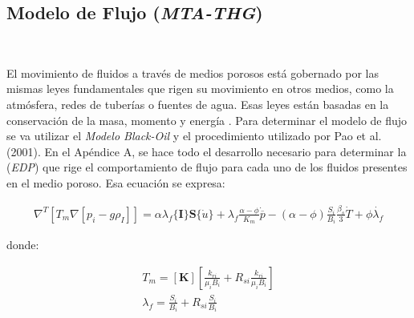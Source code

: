 \subsection{Modelo de Flujo (\textit{MTA-THG})}~\hypertarget{sec:sec322}{}
\label{sec:sec322}


El movimiento de fluidos a través de medios porosos está gobernado por las mismas leyes fundamentales que rigen su movimiento en otros medios, como la atmósfera, redes de tuberías o fuentes de agua. Esas leyes están basadas en la conservación de la masa, momento y energía \cite{Aziz1979PetroleumSimulation}. Para determinar el modelo de flujo se va utilizar el \textit{Modelo Black-Oil} y el procedimiento utilizado por Pao et al.(2001). En el Apéndice A, se hace todo el desarrollo necesario para determinar la (\textit{EDP}) que rige el comportamiento de flujo para cada uno de los fluidos presentes en el medio poroso. Esa ecuación se expresa:\\


\begin{ceqn} 
\label{eq:equ326} 
\begin{gather}
\nabla^T \left[ T_m \nabla[p_i - g\rho_I]\right] =
\alpha \lambda_f\{\mathbf{I}\}\mathbf{S}\{\dot{u}\} + \lambda_f \frac{\alpha - \phi}{K_m}\dot{\overline{p}} - (\alpha - \phi)\frac{S_i}{B_i}\frac{\beta_s}{3}\dot{T}
+ \phi \dot{\lambda_f}
\end{gather} 
\end{ceqn}
\newpage
donde:
\begin{ceqn} 
\begin{subequations} \label{eq:equ327} 
\begin{gather}
T_m = [\mathbf{K}] \left[ \frac{k_{ri}}{\mu_{i} B_{i}} + R_{si} \frac{k_{ri}}{\mu_{i} B_{i}} \right]      
\label{eq:equ327a} \\[10pt]
\lambda_f = \frac{S_i}{B_i} + R_{si}\frac{S_i}{B_i}
\label{eq:equ327b}
\end{gather}  
\end{subequations} 
\end{ceqn}


